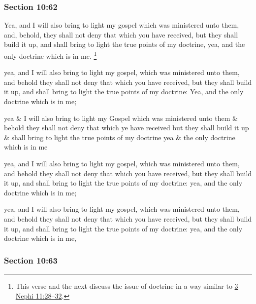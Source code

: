 	\subsubsection{Section 10:62} %
		\label{DC10-62}

		Yea, and I will also bring to light my gospel which was ministered unto them, and, behold, they shall not deny that which you have received, but they shall build it up, and shall bring to light the true points of my doctrine, yea, and the only doctrine which is in me.%
			\footnote{%
				This verse and the next discuss the issue of doctrine in a way similar to \hyperref[3NEPHI-11-28]{3 Nephi 11:28--32}.
				}

		\begin{framed}
		\scriptsize
			\begin{compactdesc}
				\item[JSP] yea, and I will also bring to light my gospel, which was ministered unto them, and behold they shall not deny that which you have received, but they shall build it up, and shall bring to light the true points of my doctrine: Yea, and the only doctrine which is in me;
				\item[RB1] yea \& I will also bring to light my Gospel which was ministered unto them \& behold they shall not deny that which ye have received but they shall build it up \& shall bring to light the true points of my doctrine yea \& the only doctrine which is in me
				\item[DC 1835] yea, and I will also bring to light my gospel, which was ministered unto them, and behold they shall not deny that which you have received, but they shall build it up, and shall bring to light the true points of my doctrine: yea, and the only doctrine which is in me;
				\item[DC 1844] yea, and I will also bring to light my gospel, which was ministered unto them, and behold they shall not deny that which you have received, but they shall build it up, and shall bring to light the true points of my doctrine: yea, and the only doctrine which is in me,
			\end{compactdesc}
		\end{framed}

	\subsubsection{Section 10:63} %
		\label{DC10-63}

